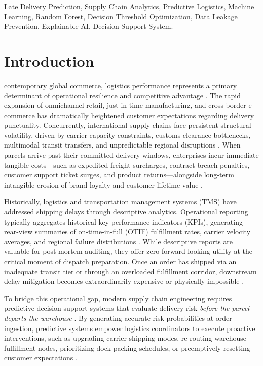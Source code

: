 \documentclass[journal,10pt,twocolumn]{IEEEtran}
\begin{document}
\begin{IEEEkeywords}
Late Delivery Prediction, Supply Chain Analytics, Predictive Logistics, Machine Learning, Random Forest, Decision Threshold Optimization, Data Leakage Prevention, Explainable AI, Decision-Support System.
\end{IEEEkeywords}

\section{Introduction}
\label{sec:introduction}
 contemporary global commerce, logistics performance represents a primary determinant of operational resilience and competitive advantage \cite{christopher2016logistics}. The rapid expansion of omnichannel retail, just-in-time manufacturing, and cross-border e-commerce has dramatically heightened customer expectations regarding delivery punctuality. Concurrently, international supply chains face persistent structural volatility, driven by carrier capacity constraints, customs clearance bottlenecks, multimodal transit transfers, and unpredictable regional disruptions \cite{ivanov2019digital}. When parcels arrive past their committed delivery windows, enterprises incur immediate tangible costs---such as expedited freight surcharges, contract breach penalties, customer support ticket surges, and product returns---alongside long-term intangible erosion of brand loyalty and customer lifetime value \cite{baryannis2019supply}.

Historically, logistics and transportation management systems (TMS) have addressed shipping delays through descriptive analytics. Operational reporting typically aggregates historical key performance indicators (KPIs), generating rear-view summaries of on-time-in-full (OTIF) fulfillment rates, carrier velocity averages, and regional failure distributions \cite{pournader2021applications}. While descriptive reports are valuable for post-mortem auditing, they offer zero forward-looking utility at the critical moment of dispatch preparation. Once an order has shipped via an inadequate transit tier or through an overloaded fulfillment corridor, downstream delay mitigation becomes extraordinarily expensive or physically impossible \cite{ni2020forecasting}. 

To bridge this operational gap, modern supply chain engineering requires predictive decision-support systems that evaluate delivery risk \emph{before the parcel departs the warehouse} \cite{ghadge2012supply}. By generating accurate risk probabilities at order ingestion, predictive systems empower logistics coordinators to execute proactive interventions, such as upgrading carrier shipping modes, re-routing warehouse fulfillment nodes, prioritizing dock packing schedules, or preemptively resetting customer expectations \cite{simchilevi2014from}.
\end{document}
